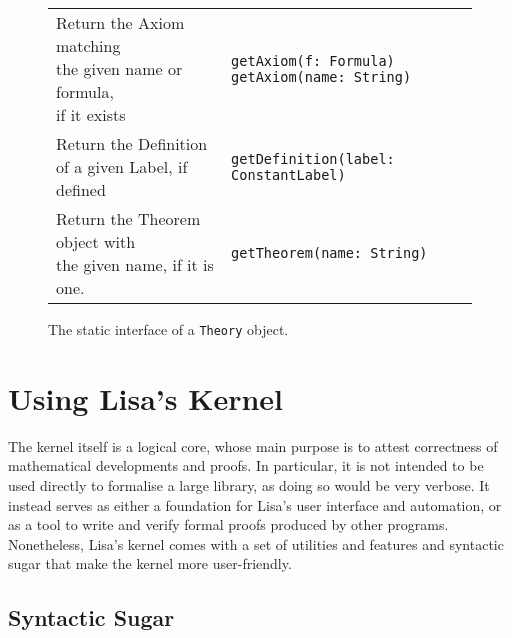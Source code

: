 {\begin{figure}[hp]
\begin{center}
\begin{tabular}{l|l}
        \makecell[l]{Return the Axiom matching        \\ the given name or formula,\\ if it exists} &
            \begin{lstlisting}
getAxiom(f: Formula)
getAxiom(name: String)
\end{lstlisting}
        \\ %
        \makecell[l]{Return the Definition            \\of a given Label, if defined} &
            \begin{lstlisting}
getDefinition(label: ConstantLabel)
\end{lstlisting}
        \\ %

        \makecell[l]{Return the Theorem object with   \\the given name, if it is one.} &
            \begin{lstlisting}
getTheorem(name: String)
\end{lstlisting}
        \\ %
      \end{tabular}
      \caption{The static interface of a \lstinline|Theory|{} object.}
      \label{fig:theorygetters}
    \end{center}
  \end{figure}

  \fi
}

\section{Using Lisa's Kernel}
\label{sec:kernelHelpers}
The kernel itself is a logical core, whose main purpose is to attest correctness of mathematical developments and proofs. In particular, it is not intended to be used directly to formalise a large library, as doing so would be very verbose. It instead serves as either a foundation for Lisa's user interface and automation, or as a tool to write and verify formal proofs produced by other programs.
Nonetheless, Lisa's kernel comes with a set of utilities and features and syntactic sugar that make the kernel more user-friendly.
\subsection{Syntactic Sugar}

